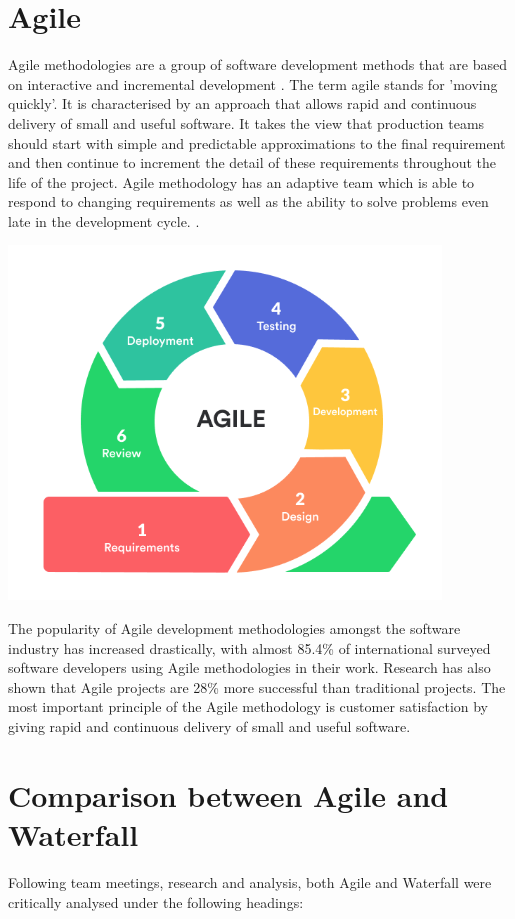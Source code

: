 \section{Agile}
Agile methodologies are a group of software development methods that are based on interactive and incremental development \cite{kumar2012impact}. The term agile stands for 'moving quickly'. It is characterised by an approach that allows rapid and continuous delivery of small and useful software. It takes the view  that production teams should start with simple and predictable approximations to the final requirement and then continue to increment the detail of these requirements throughout the life of the project. Agile methodology has an adaptive team which is able to respond to changing requirements as well as the ability to solve problems even late in the development cycle. \cite{balaji2012waterfall}.
\begin{center}    
      \includegraphics[scale=0.8]{img/Agile.png}
\end{center}
The popularity of Agile development methodologies amongst the software industry has increased drastically, with almost 85.4\% of international surveyed software developers using Agile methodologies in their work. \cite{agileStats} Research has also shown that Agile projects are 28\% more successful than traditional projects. The most important principle of the Agile methodology is customer satisfaction by giving rapid and continuous delivery of small and useful software.

\section{Comparison between Agile and Waterfall}
Following team meetings, research and analysis, both Agile and Waterfall were critically analysed under the following headings:

